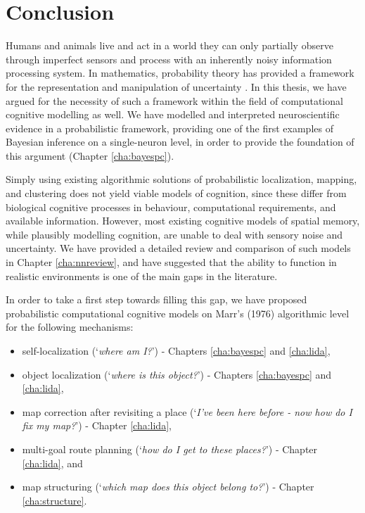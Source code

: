 \chapter{Conclusion}
\label{cha:conclusion}

Humans and animals live and act in a world they can only partially observe through imperfect sensors and process with an inherently noisy information processing system. In mathematics, probability theory has provided a framework for the representation and manipulation of uncertainty \citep{jaynes1996probability}. In this thesis, we have argued for the necessity of such a framework within the field of computational cognitive modelling as well. We have modelled and interpreted neuroscientific evidence in a probabilistic framework, providing one of the first examples of Bayesian inference on a single-neuron level, in order to provide the foundation of this argument (Chapter \ref{cha:bayespc}). 

Simply using existing algorithmic solutions of probabilistic localization, mapping, and clustering does not yield viable models of cognition, since these differ from biological cognitive processes in behaviour, computational requirements, and available information. However, most existing cognitive models of spatial memory, while plausibly modelling cognition, are unable to deal with sensory noise and uncertainty. We have provided a detailed review and comparison of such models in Chapter \ref{cha:nnreview}, and have suggested that the ability to function in realistic environments is one of the main gaps in the literature.

In order to take a first step towards filling this gap, we have proposed probabilistic computational cognitive models on Marr's (1976) algorithmic level for the following mechanisms:

\begin{itemize}
	\item self-localization (`\textit{where am I?}') - Chapters \ref{cha:bayespc} and \ref{cha:lida},
	\item object localization (`\textit{where is this object?}') - Chapters \ref{cha:bayespc} and \ref{cha:lida},
	\item map correction after revisiting a place (`\textit{I've been here before - now how do I fix my map?}') - Chapter \ref{cha:lida}, 
	\item multi-goal route planning (`\textit{how do I get to these places?}') - Chapter \ref{cha:lida}, and
	\item map structuring (`\textit{which map does this object belong to?}') - Chapter \ref{cha:structure}.
\end{itemize}

